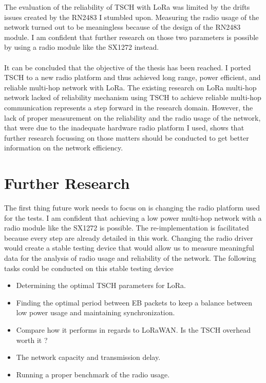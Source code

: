 \documentclass[11pt]{report}
\begin{document}
The evaluation of the reliability of TSCH with LoRa was limited by
the drifts issues created by the RN2483 I stumbled upon.
Measuring the radio usage of the network turned out to be meaningless
because of the design of the RN2483 module.
I am confident that further research on those two parameters
is possible by using a radio module like the SX1272 instead.

\paragraph{}

It can be concluded that the objective of the thesis has been reached.
I ported TSCH to a new radio platform and thus achieved long range, power
efficient, and reliable multi-hop network with LoRa.
The existing research on LoRa multi-hop network lacked of reliability mechanism
using TSCH to achieve reliable multi-hop communication
represents a step forward in the research domain.
However, the lack of proper measurement on the reliability and the radio usage
of the network, that were due to the inadequate hardware radio platform I used,
shows that further research focussing on those matters should
be conducted to get better information on the network efficiency.

\newpage

\section*{Further Research\label{section:further}}

The first thing future work needs to focus on is changing the radio platform
used for the tests.
I am confident that achieving a low power multi-hop network with a radio module
like the SX1272 is possible.
The re-implementation is facilitated because every step are already detailed in
this work.
Changing the radio driver would create a stable testing device that would allow
us to measure meaningful data for the analysis of radio usage and
reliability of the network.
The following tasks could be conducted on this stable testing device

\begin{itemize}
  \item Determining the optimal TSCH parameters for LoRa.
  \item Finding the optimal period between EB packets to keep a balance between
    low power usage and maintaining synchronization.
  \item Compare how it performs in regards to LoRaWAN. Is the TSCH overhead
    worth it ?
  \item The network capacity and transmission delay.
  \item Running a proper benchmark of the radio usage.
\end{itemize}
\end{document}
